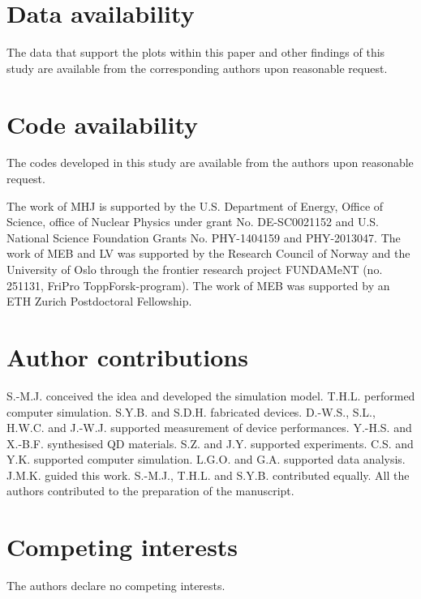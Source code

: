 \documentclass[superscriptaddress,unsortedaddress,
 amsmath,amssymb,
 aps,
]{revtex4-2}
\begin{document}
\section*{Data availability} 
The data that support the plots within this paper and other findings of this study are
available from the corresponding authors upon reasonable request.

\section*{Code availability} 
The codes developed in this study are available from the authors upon reasonable
request.


\begin{acknowledgments}

The work of MHJ is supported by the U.S. Department of Energy,
Office of Science, office of Nuclear Physics under grant
No. DE-SC0021152 and U.S. National Science Foundation Grants
No. PHY-1404159 and PHY-2013047. 
The work of MEB and LV was supported by the Research Council of Norway and the University of Oslo through the frontier research project FUNDAMeNT (no. 251131, FriPro ToppForsk-program). 
The work of MEB was supported by an ETH Zurich Postdoctoral Fellowship. 

\end{acknowledgments}

\section*{Author contributions} 
S.-M.J. conceived the idea and developed the simulation model. T.H.L. performed
computer simulation. S.Y.B. and S.D.H. fabricated devices. D.-W.S., S.L., H.W.C. and
J.-W.J. supported measurement of device performances. Y.-H.S. and X.-B.F.
synthesised QD materials. S.Z. and J.Y. supported experiments. C.S. and Y.K.
supported computer simulation. L.G.O. and G.A. supported data analysis. J.M.K.
guided this work. S.-M.J., T.H.L. and S.Y.B. contributed equally. 
All the authors contributed to the preparation of the manuscript.

\section*{Competing interests}
The authors declare no competing interests.
\end{document}
